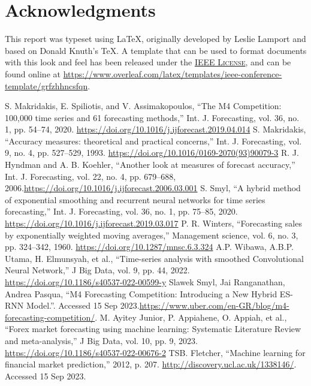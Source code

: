 \documentclass[conference]{IEEEtran}
\begin{document}
\section*{Acknowledgments}

This report was typeset using \LaTeX, originally developed by Leslie Lamport and based on Donald Knuth's \TeX. A template that can be used to format documents with this look and feel has been released under the \href{https://www.ieee.org/publications/subscriptions/info/licensing.html}{\textsc{IEEE License}}, and can be found online at \url{https://www.overleaf.com/latex/templates/ieee-conference-template/grfzhhncsfqn}.

\begin{thebibliography}{00}
 S. Makridakis, E. Spiliotis, and V. Assimakopoulos, ``The M4 Competition: 100,000 time series and 61 forecasting methods,'' Int. J. Forecasting, vol. 36, no. 1, pp. 54--74, 2020. \url{https://doi.org/10.1016/j.ijforecast.2019.04.014}
 S. Makridakis, ``Accuracy measures: theoretical and practical concerns,'' Int. J. Forecasting, vol. 9, no. 4, pp. 527--529, 1993.
\url{https://doi.org/10.1016/0169-2070(93)90079-3}
 R. J. Hyndman and A. B. Koehler, ``Another look at measures of forecast accuracy,'' Int. J. Forecasting, vol. 22, no. 4, pp. 679--688, 2006.\url{https://doi.org/10.1016/j.ijforecast.2006.03.001}
 S. Smyl, ``A hybrid method of exponential smoothing and recurrent neural networks for time series forecasting,'' Int. J. Forecasting, vol. 36, no. 1, pp. 75--85, 2020. \url{https://doi.org/10.1016/j.ijforecast.2019.03.017}
 P. R. Winters, ``Forecasting sales by exponentially weighted moving averages,'' Management science, vol. 6, no. 3, pp. 324--342, 1960. \url{https://doi.org/10.1287/mnsc.6.3.324}
 A.P. Wibawa, A.B.P. Utama, H. Elmunsyah, et al., ``Time-series analysis with smoothed Convolutional Neural Network,'' J Big Data, vol. 9, pp. 44, 2022. \url{https://doi.org/10.1186/s40537-022-00599-y}
 Slawek Smyl, Jai Ranganathan, Andrea Pasqua, ``M4 Forecasting Competition: Introducing a New Hybrid ES-RNN Model.''. Accessed 15 Sep 2023.\url{https://www.uber.com/en-GR/blog/m4-forecasting-competition/}. 
 M. Ayitey Junior, P. Appiahene, O. Appiah, et al., ``Forex market forecasting using machine learning: Systematic Literature Review and meta-analysis,'' J Big Data, vol. 10, pp. 9, 2023. \url{https://doi.org/10.1186/s40537-022-00676-2}
 TSB. Fletcher, ``Machine learning for financial market prediction,'' 2012, p. 207. \url{http://discovery.ucl.ac.uk/1338146/}. Accessed 15 Sep 2023.

\end{thebibliography}
\end{document}
